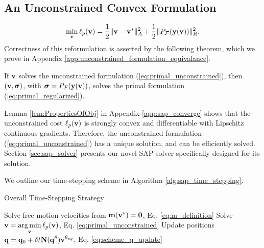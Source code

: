 

\subsection{An Unconstrained Convex Formulation}
\label{sec:unconstrained_convex_formulation}

\begin{eqnarray}
	\min_{\mf{v}} \ell_p(\mf{v}) = \frac{1}{2}\Vert\mf{v}-\mf{v}^*\Vert_{A}^2 +
	\frac{1}{2}\Vert P_\mathcal{F}(\mf{y}(\mf{v}))\Vert_R^2.
	\label{eq:primal_unconstrained}
\end{eqnarray}
Correctness of this reformulation is asserted by the following theorem, which we
prove in Appendix \ref{app:unconstrained_formulation_equivalance}.
\begin{theorem}
  If  ${\mathbf{v}}$ solves the unconstrained formulation
    (\ref{eq:primal_unconstrained}), then $({\mathbf{v}}, {\bm\sigma})$, with ${\bm\sigma}
    =P_\mathcal{F}({\mathbf{y}}({\mathbf{v}}))$, solves the primal formulation
    (\ref{eq:primal_regularized}).
    \label{th:unconstrained_formulation_equivalance}
\end{theorem}
Lemma \ref{lem:PropertiesOfObj} in Appendix \ref{app:sap_converge} shows that
the unconstrained cost $\ell_p({\mathbf{v}})$ is strongly convex and differentiable
with Lipschitz continuous gradients. Therefore, the unconstrained formulation
(\ref{eq:primal_unconstrained}) has a unique solution, and can be efficiently
solved.  
Section \ref{sec:sap_solver} presents our novel SAP solver specifically designed
for its solution.

We outline our time-stepping scheme in Algorithm \ref{alg:sap_time_stepping}.
\begin{algorithm}
	\caption{Overall Time-Stepping Strategy}
	  \label{alg:sap_time_stepping}
	  \begin{algorithmic}[1]
		  \State Solve free motion velocities from
		  ${\mathbf{m}}({\mathbf{v}}^*)={\mathbf{0}}$, Eq. \eqref{eq:m_definition}
		  \State Solve $\displaystyle {\mathbf{v}} = \operatorname*{arg\,min}_{{\mathbf{v}}} \ell_p({\mathbf{v}})$, Eq. \eqref{eq:primal_unconstrained}
		  \State Update positions $\displaystyle {\mathbf{q}} = {\mathbf{q}}_0 + \delta
		  t{\mathbf{N}}({\mathbf{q}}^{\theta}){\mathbf{v}}^{\theta_{vq}}$, Eq. \eqref{eq:scheme_q_update}
	  \end{algorithmic}
\end{algorithm}

